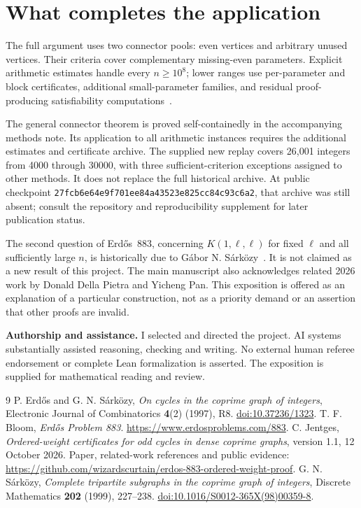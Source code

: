 \documentclass[11pt,letterpaper]{article}
\theoremstyle{remark}\newtheorem{remark}[theorem]{Remark}
\begin{document}
\section{What completes the application}
The full argument uses two connector pools: even vertices and arbitrary unused vertices. Their criteria cover complementary missing-even parameters. Explicit arithmetic estimates handle every $n\ge10^8$; lower ranges use per-parameter and block certificates, additional small-parameter families, and residual proof-producing satisfiability computations~\cite{Jentges}.

The general connector theorem is proved self-containedly in the accompanying methods note. Its application to all arithmetic instances requires the additional estimates and certificate archive. The supplied new replay covers 26,001 integers from 4000 through 30000, with three sufficient-criterion exceptions assigned to other methods. It does not replace the full historical archive. At public checkpoint \texttt{27fcb6e64e9f701ee84a43523e825cc84c93c6a2}, that archive was still absent; consult the repository and reproducibility supplement for later publication status.

The second question of Erd\H{o}s~883, concerning $K(1,\ell,\ell)$ for fixed $\ell$ and all sufficiently large $n$, is historically due to G\'abor N. S\'ark\"ozy~\cite{S99}. It is not claimed as a new result of this project. The main manuscript also acknowledges related 2026 work by Donald Della Pietra and Yicheng Pan. This exposition is offered as an explanation of a particular construction, not as a priority demand or an assertion that other proofs are invalid.

\medskip
\noindent\textbf{Authorship and assistance.} I selected and directed the project. AI systems substantially assisted reasoning, checking and writing. No external human referee endorsement or complete Lean formalization is asserted. The exposition is supplied for mathematical reading and review.

\begin{thebibliography}{9}
 P. Erd\H{o}s and G. N. S\'ark\"ozy, \emph{On cycles in the coprime graph of integers}, Electronic Journal of Combinatorics \textbf{4}(2) (1997), R8. \href{https://doi.org/10.37236/1323}{doi:10.37236/1323}.
 T. F. Bloom, \emph{Erd\H{o}s Problem 883}. \url{https://www.erdosproblems.com/883}.
 C. Jentges, \emph{Ordered-weight certificates for odd cycles in dense coprime graphs}, version 1.1, 12 October 2026. Paper, related-work references and public evidence: \url{https://github.com/wizardscurtain/erdos-883-ordered-weight-proof}.
 G. N. S\'ark\"ozy, \emph{Complete tripartite subgraphs in the coprime graph of integers}, Discrete Mathematics \textbf{202} (1999), 227--238. \href{https://doi.org/10.1016/S0012-365X(98)00359-8}{doi:10.1016/S0012-365X(98)00359-8}.
\end{thebibliography}
\end{document}
